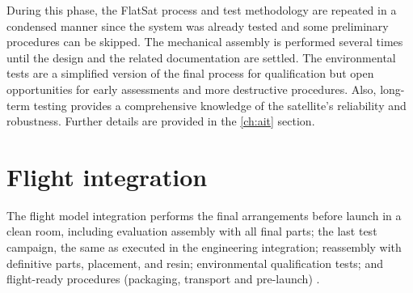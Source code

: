 During this phase, the FlatSat process and test methodology are repeated in a condensed manner since the system was already tested and some preliminary procedures can be skipped. The mechanical assembly is performed several times until the design and the related documentation are settled. The environmental tests are a simplified version of the final process for qualification but open opportunities for early assessments and more destructive procedures. Also, long-term testing provides a comprehensive knowledge of the satellite's reliability and robustness. Further details are provided in the \autoref{ch:ait} section.


\section{Flight integration}

The flight model integration performs the final arrangements before launch in a clean room, including evaluation assembly with all final parts; the last test campaign, the same as executed in the engineering integration; reassembly with definitive parts, placement, and resin; environmental qualification tests; and flight-ready procedures (packaging, transport and pre-launch) \cite{marcelino2021}.










